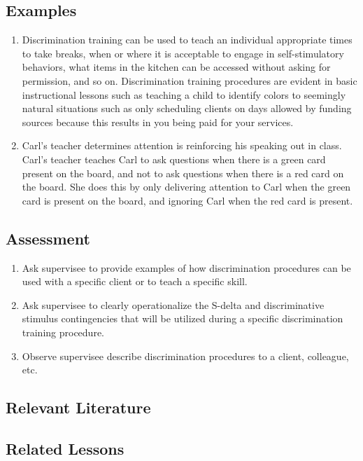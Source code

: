 \subsection{Examples}
\begin{enumerate}
\item Discrimination training can be used to teach an individual appropriate times to take breaks, when or where it is acceptable to engage in self-stimulatory behaviors, what items in the kitchen can be accessed without asking for permission, and so on. Discrimination training procedures are evident in basic instructional lessons such as teaching a child to identify colors to seemingly natural situations such as only scheduling clients on days allowed by funding sources because this results in you being paid for your services. 
\item Carl's teacher determines attention is reinforcing his speaking out in class. Carl's teacher teaches Carl to ask questions when there is a green card present on the board, and not to ask questions when there is a red card on the board. She does this by only delivering attention to Carl when the green card is present on the board, and ignoring Carl when the red card is present. 
\end{enumerate}
%
\subsection{Assessment}
\begin{enumerate}
\item Ask supervisee to provide examples of how discrimination procedures can be used with a specific client or to teach a specific skill.
\item Ask supervisee to clearly operationalize the S-delta and discriminative stimulus contingencies that will be utilized during a specific discrimination training procedure.
\item Observe supervisee describe discrimination procedures to a client, colleague, etc.
\end{enumerate}
%
\subsection{Relevant Literature}
\begin{refsection}
\nocite{cooper2007applied,
        malott2003principles,
        taylor2014discrimination}
\printbibliography[heading=none]
\end{refsection}
%
\subsection{Related Lessons}
\fourdEight{}\\
\foureOne{}\\
\foureThree{}\\
\foureThirteen{}\\
\fourjEleven{}\\
\fourFKEleven{}\\
\fourFKTwentyFour{}\\
\fourFKTwentyFive{}\\
\fourFKThirtyFive{}\\
